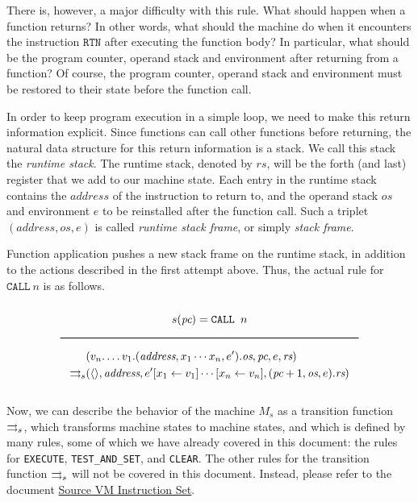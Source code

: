 \begin{appendices}
There is, however, a major difficulty with this rule. What should happen when a function returns? In other words, what should the machine do when it encounters the instruction \(\texttt{RTN}\) after executing the function body? In particular, what should be the program counter, operand stack and environment after returning from a function? Of course, the program counter, operand stack and environment must be restored to their state before the function call.

In order to keep program execution in a simple loop, we need to make this return information explicit. Since functions can call other functions before returning, the natural data structure for this return information is a stack. We call this stack the \emph{runtime stack}. The runtime stack, denoted by \(\textit{rs}\), will be the forth (and last) register that we add to our machine state. Each entry in the runtime stack contains the \(\textit{address}\) of the instruction to return to, and the operand stack \(\textit{os}\) and environment \(e\) to be reinstalled after the function call. Such a triplet \((\textit{address},\textit{os},e)\) is called \emph{runtime stack frame}, or simply \emph{stack frame}.

Function application pushes a new stack frame on the runtime stack, in addition to the actions described in the first attempt above. Thus, the actual rule for \(\texttt{CALL}\ n\) is as follows.

$$\Rule{s(\textit{pc}) = \texttt{CALL } n}{
\begin{aligned}
&(v_n.\ldots v_1.(\textit{address},x_1\cdots x_n,e').\textit{os},\textit{pc},e,\textit{rs})\\
\transition &(\langle \rangle,\textit{address},e'[x_1 \leftarrow v_1]\cdots[x_n \leftarrow v_n],(\textit{pc}+1,\textit{os},e).\textit{rs})
\end{aligned}}$$

Now, we can describe the behavior of the machine \(M_s\) as a transition function \(\rightrightarrows_s\), which transforms machine states to machine states, and which is defined by many rules, some of which we have already covered in this document: the rules for \texttt{EXECUTE}, \texttt{TEST\_AND\_SET}, and \texttt{CLEAR}.
The other rules for the transition function \(\rightrightarrows_s\) will not be covered in this document. Instead, please refer to the document \href{svml-is.pdf}{Source VM Instruction Set}.
\end{appendices}
